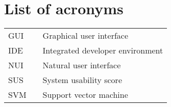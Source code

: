 \chapter*{List of acronyms}

\setlength{\LTleft}{0pt}
\begin{longtable}{lll}
GUI	& \phantom{xxxxxxx} & Graphical user interface\\
IDE & \phantom{xxxxxxx} & Integrated developer environment\\
NUI & \phantom{xxxxxxx} & Natural user interface\\
SUS & \phantom{xxxxxxx} & System usability score\\
SVM	& \phantom{xxxxxxx} & Support vector machine\\
\end{longtable}
